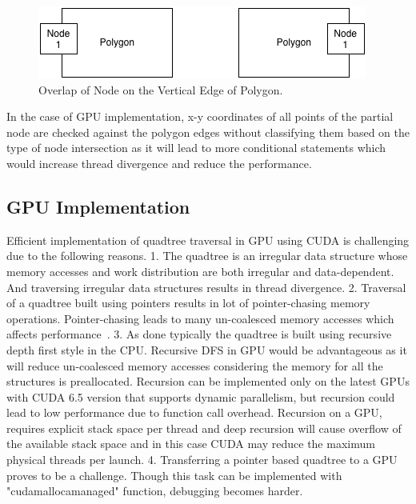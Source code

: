 \begin{figure}[H]
\centering
\vspace{0.5in}
\includegraphics[scale=0.8]{Images/OverlapScenario5}
\vspace{0.5in}
\caption{Overlap of Node on the Vertical Edge of Polygon.}
\label{fig:overlap3}
\end{figure}

In the case of GPU implementation, x-y coordinates of all points of the partial node are checked against the polygon edges without classifying them based on the type of node intersection as it will lead to more conditional statements which would increase thread divergence and reduce the performance.

\subsection{GPU Implementation}

Efficient implementation of quadtree traversal in GPU using CUDA is challenging due to the following reasons. 1. The quadtree is an irregular data structure whose memory accesses and work distribution are both irregular and data-dependent. And traversing irregular data structures results in thread divergence.
2. Traversal of a quadtree built using pointers results in lot of pointer-chasing memory operations. Pointer-chasing leads to many un-coalesced memory accesses which affects performance~\cite{barnes:hut}.
3. As done typically the quadtree is built using recursive depth first style in the CPU. Recursive DFS in GPU would be advantageous as it will reduce un-coalesced memory accesses considering the memory for all the structures is preallocated. Recursion can be implemented only on the latest GPUs with CUDA 6.5 version that supports dynamic parallelism, but recursion could lead to low performance due to function call overhead. Recursion on a GPU, requires explicit stack space per thread and deep recursion will cause overflow of the available stack space and in this case CUDA may reduce the maximum physical threads per launch.
4. Transferring a pointer based quadtree to a GPU proves to be a challenge. Though this task can be implemented with "cudamallocamanaged" function, debugging becomes harder.

